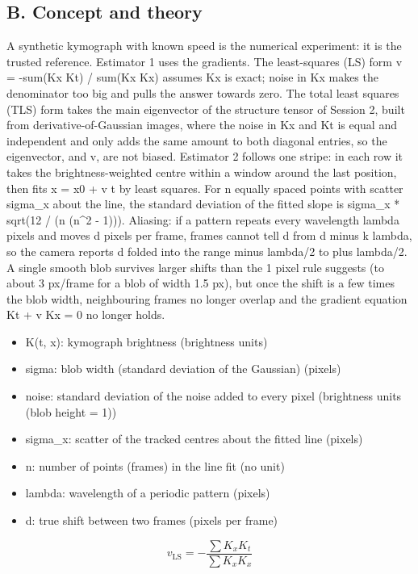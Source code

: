 \documentclass[11pt,a4paper]{article}
\begin{document}
\subsection*{B. Concept and theory}
A synthetic kymograph with known speed is the numerical experiment: it is the trusted reference. Estimator 1 uses the gradients. The least-squares (LS) form v = -sum(Kx Kt) / sum(Kx Kx) assumes Kx is exact; noise in Kx makes the denominator too big and pulls the answer towards zero. The total least squares (TLS) form takes the main eigenvector of the structure tensor of Session 2, built from derivative-of-Gaussian images, where the noise in Kx and Kt is equal and independent and only adds the same amount to both diagonal entries, so the eigenvector, and v, are not biased. Estimator 2 follows one stripe: in each row it takes the brightness-weighted centre within a window around the last position, then fits x = x0 + v t by least squares. For n equally spaced points with scatter sigma\_x about the line, the standard deviation of the fitted slope is sigma\_x * sqrt(12 / (n (n\textasciicircum{}2 - 1))). Aliasing: if a pattern repeats every wavelength lambda pixels and moves d pixels per frame, frames cannot tell d from d minus k lambda, so the camera reports d folded into the range minus lambda/2 to plus lambda/2. A single smooth blob survives larger shifts than the 1 pixel rule suggests (to about 3 px/frame for a blob of width 1.5 px), but once the shift is a few times the blob width, neighbouring frames no longer overlap and the gradient equation Kt + v Kx = 0 no longer holds.

\begin{itemize}[nosep]
\item K(t, x): kymograph brightness (brightness units)
\item sigma: blob width (standard deviation of the Gaussian) (pixels)
\item noise: standard deviation of the noise added to every pixel (brightness units (blob height = 1))
\item sigma\_x: scatter of the tracked centres about the fitted line (pixels)
\item n: number of points (frames) in the line fit (no unit)
\item lambda: wavelength of a periodic pattern (pixels)
\item d: true shift between two frames (pixels per frame)
\end{itemize}

\begin{equation*}
v_{\mathrm{LS}}=-\frac{\sum K_xK_t}{\sum K_xK_x}
\end{equation*}
\end{document}
